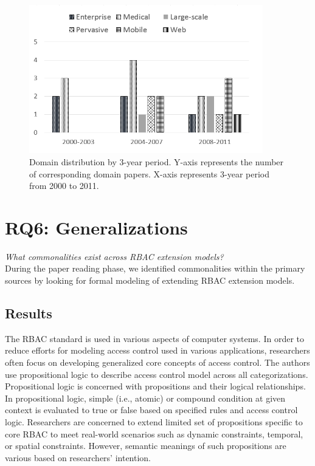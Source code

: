 \begin{figure}[ht]
    \centering
        \includegraphics[width=4.0in]{sections/dist_domains_byYear.png}
\vspace{-0.2 in}
    \caption{\label{fig:dist_domains}Domain distribution by 3-year period. Y-axis represents the number of corresponding domain papers.
    X-axis represents 3-year period from 2000 to 2011.}
\end{figure}

\section{RQ6: Generalizations} \label{sec:generalizations}

\textit{What commonalities exist across RBAC extension models?}
\\

During the paper reading phase, we identified commonalities within the primary sources
by looking for formal modeling of extending RBAC extension models.

\subsection{Results}

The RBAC standard is used in various aspects of computer systems. In order to reduce efforts for modeling access control used in various applications, researchers often focus on developing generalized core concepts of access control.
The authors use propositional logic to describe access control model across all categorizations. Propositional logic is concerned with propositions and their logical relationships. In propositional logic, simple (i.e., atomic) or compound condition at given context is evaluated to true or false based on specified rules and access control logic. Researchers are concerned to extend limited set of propositions specific to core RBAC to meet real-world scenarios such as dynamic constraints, temporal, or spatial constraints. However, semantic meanings of such propositions are various based on researchers' intention.

